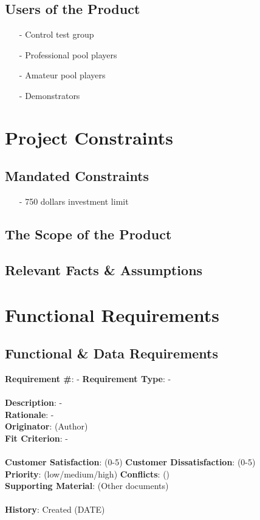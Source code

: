 \documentclass[titlepage]{article}
\begin{document}
\subsection{Users of the Product}
\begin{itemize}
	\item[-] Control test group
	\item[-] Professional pool players
	\item[-] Amateur pool players
	\item[-] Demonstrators
\end{itemize}


\section{Project Constraints}
\subsection{Mandated Constraints}%
\begin{itemize}
	\item[-] 750 dollars investment limit
\end{itemize}

\subsection{The Scope of the Product}
\subsection{Relevant Facts \& Assumptions}


\section{Functional Requirements}
\subsection{Functional \& Data Requirements}
\begin{framed}
\noindent\textbf{Requirement \#}: - \hfill \textbf{Requirement Type}: - \hfill\\\\
\noindent\textbf{Description}: -\\
\textbf{Rationale}: -\\
\textbf{Originator}: (Author)\\
\textbf{Fit Criterion}: -\\\\
\noindent\textbf{Customer Satisfaction}: (0-5) \hfill 	\textbf{Customer Dissatisfaction}: (0-5) \hfill\\
\textbf{Priority}: (low/medium/high) \hfill \textbf{Conflicts}: () \hfill 		\\
\textbf{Supporting Material}: (Other documents)\\\\
\noindent\textbf{History}: Created (DATE)
\end{framed}
\end{document}
